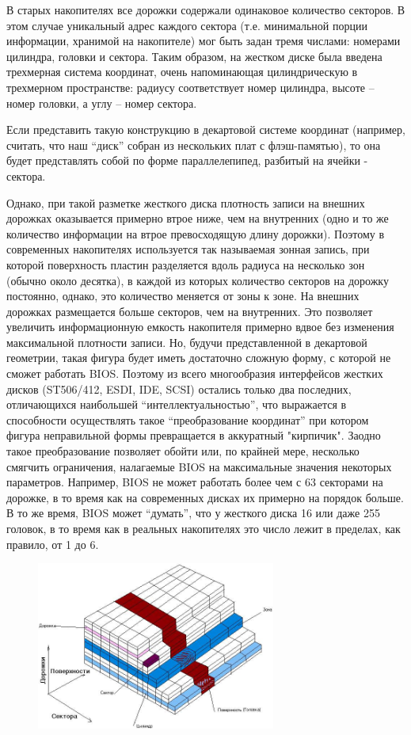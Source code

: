 \documentclass[bachelor, och, referat]{SCWorks}
\begin{document}
В старых накопителях все дорожки содержали одинаковое количество секторов. В 
этом случае уникальный адрес каждого сектора (т.е. минимальной порции 
информации, хранимой на накопителе) мог быть задан тремя числами: номерами
цилиндра, головки и сектора. Таким образом, на жестком диске была введена 
трехмерная система координат, очень напоминающая цилиндрическую в трехмерном 
пространстве: радиусу соответствует номер цилиндра, высоте – номер головки, 
а углу – номер сектора.

Если представить такую конструкцию в декартовой системе координат (например, 
считать, что наш ``диск'' собран из нескольких плат с флэш-памятью), то она будет 
представлять собой по форме параллелепипед, разбитый на ячейки - сектора.

Однако, при такой разметке жесткого диска плотность записи на внешних дорожках 
оказывается примерно втрое ниже, чем на внутренних (одно и то же количество 
информации на втрое превосходящую длину дорожки). Поэтому в современных 
накопителях используется так называемая зонная запись, при которой поверхность 
пластин разделяется вдоль радиуса на несколько зон (обычно около десятка), в 
каждой из которых количество секторов на дорожку постоянно, однако, это 
количество меняется от зоны к зоне. На внешних дорожках размещается больше 
секторов, чем на внутренних. Это позволяет увеличить информационную емкость 
накопителя примерно вдвое без изменения максимальной плотности записи. Но, 
будучи представленной в декартовой геометрии, такая фигура будет иметь 
достаточно сложную форму, с которой не сможет работать BIOS. Поэтому из всего 
многообразия интерфейсов жестких дисков (ST506/412, ESDI, IDE, SCSI) остались 
только два последних, отличающихся наибольшей ``интеллектуальностью'', что 
выражается в способности осуществлять такое ``преобразование координат'' при 
котором фигура неправильной формы превращается в аккуратный "кирпичик". Заодно 
такое преобразование позволяет обойти или, по крайней мере, несколько смягчить 
ограничения, налагаемые BIOS на максимальные значения некоторых параметров. 
Например, BIOS не может работать более чем с 63 секторами на дорожке, в то 
время как на современных дисках их примерно на порядок больше. В то же время, 
BIOS может ``думать'', что у жесткого диска 16 или даже 255 головок, в то время 
как в реальных накопителях это число лежит в пределах, как правило, от 1 до 6.

\begin{figure}[H]
    \centering
    \includegraphics[width=0.7\textwidth]{layers_hdd.png}
    \caption{}
    \label{fig:layers}
\end{figure}
  
\end{document}
